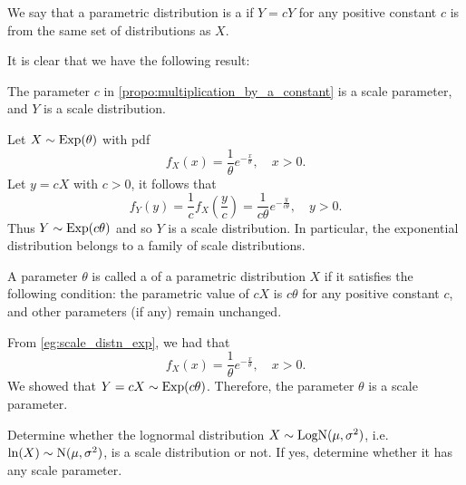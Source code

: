 \documentclass[notoc,notitlepage]{tufte-book}
\begin{document}
\begin{defn}\label{defn:scale_distribution}
  We say that a parametric distribution is a  if $Y = cY$ for any positive constant $c$ is from the same set of distributions as $X$.
\end{defn}

It is clear that we have the following result:

\begin{crly}\label{crly:constant_multiplication_crly}
  The parameter $c$ in \cref{propo:multiplication_by_a_constant} is a scale parameter, and $Y$ is a scale distribution.
\end{crly}

\begin{eg}\label{eg:scale_distn_exp}
  Let $X \sim \operatorname{Exp}(\theta)$ with pdf
  \begin{equation*}
    f_X(x) = \frac{1}{\theta}e^{-\frac{x}{\theta}}, \quad x > 0.
  \end{equation*}
  Let $y = cX$ with $c > 0$, it follows that
  \begin{equation*}
    f_Y(y) = \frac{1}{c}f_X\left(\frac{y}{c}\right) = \frac{1}{c \theta} e^{- \frac{y}{c \theta}}, \quad y > 0.
  \end{equation*}
  Thus $Y \sim \operatorname{Exp}(c\theta)$ and so $Y$ is a scale distribution. In particular, the exponential distribution belongs to a family of scale distributions.
\end{eg}

\begin{defn}\label{defn:scale_parameter}
  A parameter $\theta$ is called a  of a parametric distribution $X$ if it satisfies the following condition: the parametric value of $cX$ is $c \theta$ for any positive constant $c$, and other parameters (if any) remain unchanged.
\end{defn}

\begin{eg}
  From \cref{eg:scale_distn_exp}, we had that
  \begin{equation*}
    f_X(x) = \frac{1}{\theta}e^{-\frac{x}{\theta}}, \quad x > 0.
  \end{equation*}
  We showed that $Y = cX \sim \operatorname{Exp}(c\theta)$. Therefore, the parameter $\theta$ is a scale parameter.
\end{eg}

\begin{eg}
  Determine whether the lognormal distribution $X \sim \operatorname{LogN}(\mu, \sigma^2)$, i.e. $\ln(X) \sim \operatorname{N}(\mu, \sigma^2)$, is a scale distribution or not. If yes, determine whether it has any scale parameter.
\end{eg}
\end{document}
